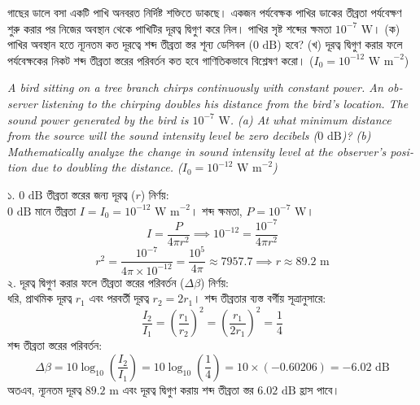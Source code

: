 \documentclass[12pt, a4paper]{article}
\begin{document}
\begin{tcolorbox}[questionbox={প্রশ্ন (Question) 10}]
\noindent
গাছের ডালে বসা একটি পাখি অনবরত নির্দিষ্ট শক্তিতে ডাকছে। একজন পর্যবেক্ষক পাখির ডাকের তীব্রতা পর্যবেক্ষণ শুরু করার পর নিজের অবস্থান থেকে পাখিটির দূরত্ব দ্বিগুণ করে নিল। পাখির সৃষ্ট শব্দের ক্ষমতা $10^{-7}\text{ W}$। (ক) পাখির অবস্থান হতে ন্যূনতম কত দূরত্বে শব্দ তীব্রতা স্তর শূন্য ডেসিবল ($0\text{ dB}$) হবে? (খ) দূরত্ব দ্বিগুণ করার ফলে পর্যবেক্ষকের নিকট শব্দ তীব্রতা স্তরের পরিবর্তন কত হবে গাণিতিকভাবে বিশ্লেষণ করো। ($I_0 = 10^{-12}\text{ W m}^{-2}$)

\vspace{0.8em}
\begin{english}
\noindent\textit{\color{darkgray}
A bird sitting on a tree branch chirps continuously with constant power. An observer listening to the chirping doubles his distance from the bird's location. The sound power generated by the bird is $10^{-7}\text{ W}$. (a) At what minimum distance from the source will the sound intensity level be zero decibels ($0\text{ dB}$)? (b) Mathematically analyze the change in sound intensity level at the observer's position due to doubling the distance. ($I_0 = 10^{-12}\text{ W m}^{-2}$)
}
\end{english}
\end{tcolorbox}

\vspace{1em}

\begin{tcolorbox}[solutionbox={সমাধান (Solution)}]
\noindent
১. $0\text{ dB}$ তীব্রতা স্তরের জন্য দূরত্ব ($r$) নির্ণয়: \\
$0\text{ dB}$ মানে তীব্রতা $I = I_0 = 10^{-12}\text{ W m}^{-2}$। শব্দ ক্ষমতা, $P = 10^{-7}\text{ W}$।
\[ I = \frac{P}{4\pi r^2} \implies 10^{-12} = \frac{10^{-7}}{4\pi r^2} \]
\[ r^2 = \frac{10^{-7}}{4\pi \times 10^{-12}} = \frac{10^5}{4\pi} \approx 7957.7 \implies r \approx 89.2\text{ m} \]
২. দূরত্ব দ্বিগুণ করার ফলে তীব্রতা স্তরের পরিবর্তন ($\Delta \beta$) নির্ণয়: \\
ধরি, প্রাথমিক দূরত্ব $r_1$ এবং পরবর্তী দূরত্ব $r_2 = 2 r_1$। শব্দ তীব্রতার ব্যস্ত বর্গীয় সূত্রানুসারে:
\[ \frac{I_2}{I_1} = \left(\frac{r_1}{r_2}\right)^2 = \left(\frac{r_1}{2r_1}\right)^2 = \frac{1}{4} \]
শব্দ তীব্রতা স্তরের পরিবর্তন:
\[ \Delta \beta = 10 \log_{10} \left(\frac{I_2}{I_1}\right) = 10 \log_{10} \left(\frac{1}{4}\right) = 10 \times (-0.60206) = -6.02\text{ dB} \]
অতএব, ন্যূনতম দূরত্ব $89.2\text{ m}$ এবং দূরত্ব দ্বিগুণ করায় শব্দ তীব্রতা স্তর $6.02\text{ dB}$ হ্রাস পাবে।
\end{tcolorbox}
\end{document}
